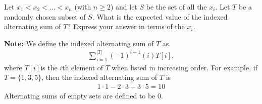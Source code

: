 
Let $x_{1} < x_{2} < \ldots < x_{n}$ (with $n \ge 2$) and let $S$ be the set of all the $x_{i}$. Let $T$ be a randomly chosen subset of $S$. What is the expected value of the indexed alternating sum of $T$? Express your answer in terms of the $x_{i}$.

\textbf{Note:} We define the indexed alternating sum of $T$ as
\begin{align*}
\sum_{i=1}^{|T|} (-1)^{i+1} (i) T[i],
\end{align*}
where $T[i]$is the $i$th element of $T$ when listed in increasing order. For example, if $T=\{1,3,5\}$, then the indexed alternating sum of $T$ is
\begin{align*}
1 \cdot 1 - 2 \cdot 3 + 3 \cdot 5 = 10
\end{align*}
Alternating sums of empty sets are defined to be $0$.
